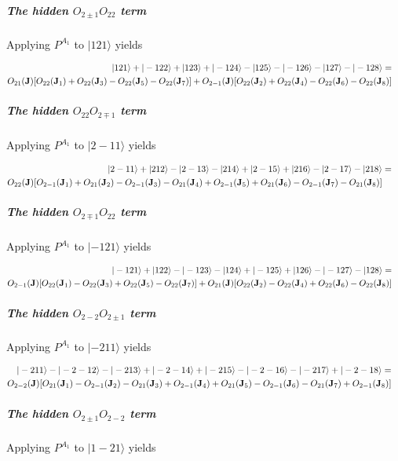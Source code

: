 \subparagraph{The hidden $O_{2\pm1}O_{22}$ term}

Applying $P^{A_1}$ to $|121\rangle$ yields 

\begin{eqnarray}\label{nnn121}
|121\rangle+|-122\rangle+|123\rangle+|-124\rangle 
-|125\rangle-|-126\rangle-|127\rangle-|-128\rangle=&& \\ \nonumber
O_{21}(\mathbf J)[O_{22}(\mathbf J_1)+O_{22}(\mathbf J_3)-O_{22}(\mathbf J_5)-O_{22}(\mathbf J_7)]+
O_{2-1}(\mathbf J)[O_{22}(\mathbf J_2)+O_{22}(\mathbf J_4)-O_{22}(\mathbf J_6)-O_{22}(\mathbf J_8)]&&
\end{eqnarray}
   
\subparagraph{The hidden $O_{22}O_{2\mp1}$ term}

Applying $P^{A_1}$ to $|2-11\rangle$ yields 

\begin{eqnarray}
 |2-11\rangle+|212\rangle-|2-13\rangle-|214\rangle
+|2-15\rangle+|216\rangle-|2-17\rangle-|218\rangle&=& \\ \nonumber
O_{22}(\mathbf J)[O_{2-1}(\mathbf J_1)+O_{21}(\mathbf J_2)-O_{2-1}(\mathbf J_3)-O_{21}(\mathbf J_4)
+O_{2-1}(\mathbf J_5)+O_{21}(\mathbf J_6)-O_{2-1}(\mathbf J_7)-O_{21}(\mathbf J_8)]&&
\end{eqnarray}
   
\subparagraph{The hidden $O_{2\mp1}O_{22}$ term}

Applying $P^{A_1}$ to $|-121\rangle$ yields 

\begin{eqnarray}
|-121\rangle+|122\rangle-|-123\rangle-|124\rangle 
+|-125\rangle+|126\rangle-|-127\rangle-|128\rangle=&& \\ \nonumber
O_{2-1}(\mathbf J)[O_{22}(\mathbf J_1)-O_{22}(\mathbf J_3)+O_{22}(\mathbf J_5)-O_{22}(\mathbf J_7)]+
O_{21}(\mathbf J)[O_{22}(\mathbf J_2)-O_{22}(\mathbf J_4)+O_{22}(\mathbf J_6)-O_{22}(\mathbf J_8)]&&
\end{eqnarray}

\subparagraph{The hidden $O_{2-2}O_{2\pm1}$ term}

Applying $P^{A_1}$ to $|-211\rangle$ yields 

\begin{eqnarray}
|-211\rangle-|-2-12\rangle-|-213\rangle+|-2-14\rangle 
+|-215\rangle-|-2-16\rangle-|-217\rangle+|-2-18\rangle =&& \\ \nonumber
O_{2-2}(\mathbf J)[O_{21}(\mathbf J_1)-O_{2-1}(\mathbf J_2)-O_{21}(\mathbf J_3)+O_{2-1}(\mathbf J_4)
+O_{21}(\mathbf J_5)-O_{2-1}(\mathbf J_6)-O_{21}(\mathbf J_7)+O_{2-1}(\mathbf J_8)]&&
\end{eqnarray}
 
\subparagraph{The hidden $O_{2\pm1}O_{2-2}$ term}

Applying $P^{A_1}$ to $|1-21\rangle$ yields 

